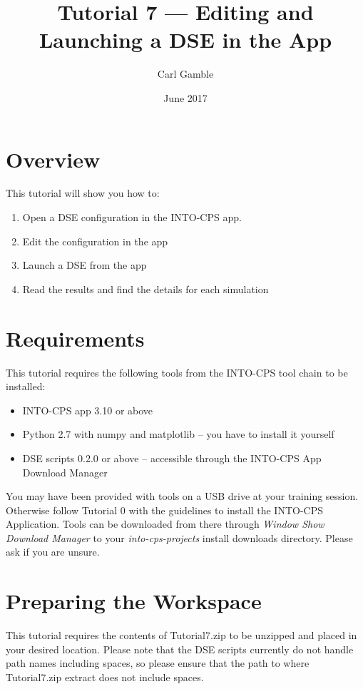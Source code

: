 \documentclass[11pt,a4paper]{../tutorial}
\title{Tutorial 7 --- Editing and Launching a DSE in the App}
\date{June 2017}
\author{Carl Gamble}
\begin{document}
\section*{Overview}

This tutorial will show you how to:

\begin{enumerate}[noitemsep]
\item Open a DSE configuration in the INTO-CPS app.
\item Edit the configuration in the app
\item Launch a DSE from the app
\item Read the results and find the details for each simulation
\end{enumerate}

\section*{Requirements}

This tutorial requires the following tools from the INTO-CPS tool chain to be installed:

\begin{itemize}[noitemsep]
\item INTO-CPS app 3.10 or above
\item Python 2.7 with numpy and matplotlib -- you have to install it yourself
\item DSE scripts 0.2.0 or above -- accessible through the INTO-CPS App Download Manager
\end{itemize}

You may have been provided with tools on a USB drive at your training session. Otherwise follow Tutorial 0 with the guidelines to install the INTO-CPS Application. Tools can be downloaded from there through \emph{Window \menusep Show Download Manager} to your \emph{into-cps-projects} install downloads directory. Please ask if you are unsure.


\section{Preparing the Workspace}
This tutorial requires the contents of Tutorial7.zip to be unzipped and placed in your desired location.  Please note that the DSE scripts currently do not handle path names including spaces, so please ensure that the path to where Tutorial7.zip extract does not include spaces.


\newpage
\end{document}
